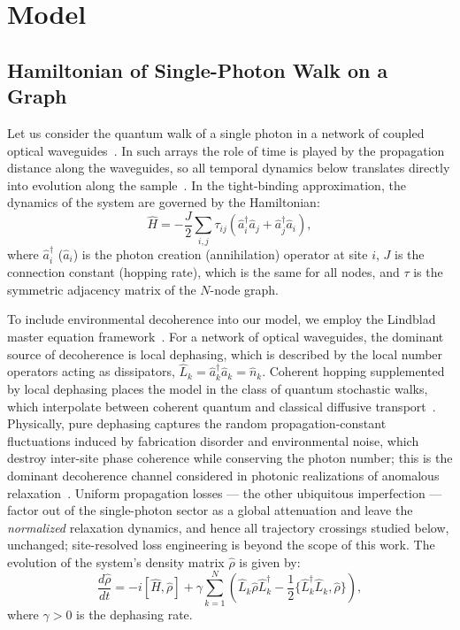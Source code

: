 \documentclass[pdflatex,sn-mathphys-num]{sn-jnl}
\begin{document}
\section{Model}

\subsection{Hamiltonian of Single-Photon Walk on a Graph}
Let us consider the quantum walk of a single photon in a network of coupled optical waveguides~\cite{tang2018}. In such arrays the role of time is played by the propagation distance along the waveguides, so all temporal dynamics below translates directly into evolution along the sample~\cite{tang2018,Longhi2024}. In the tight-binding approximation, the dynamics of the system are governed by the Hamiltonian:
\begin{equation}
\hat{H} = -\frac{J}{2}\sum_{i,j} \tau_{ij}(\hat{a}_i^{\dagger}\hat{a}_j + \hat{a}_j^{\dagger}\hat{a}_i),
\end{equation}
where $\hat{a}_i^\dagger$ ($\hat{a}_i$) is the photon creation (annihilation) operator at site $i$, $J$ is the connection constant (hopping rate), which is the same for all nodes, and $\tau$ is the symmetric adjacency matrix of the $N$-node graph.

To include environmental decoherence into our model, we employ the Lindblad master equation framework~\cite{lindblad1976,gks1976,breuer2002}. For a network of optical waveguides, the dominant source of decoherence is local dephasing, which is described by the local number operators acting as dissipators, $\hat{L}_k = \hat{a}_k^\dagger \hat{a}_k = \hat{n}_k$. Coherent hopping supplemented by local dephasing places the model in the class of quantum stochastic walks, which interpolate between coherent quantum and classical diffusive transport~\cite{Whitfield2010}. Physically, pure dephasing captures the random propagation-constant fluctuations induced by fabrication disorder and environmental noise, which destroy inter-site phase coherence while conserving the photon number; this is the dominant decoherence channel considered in photonic realizations of anomalous relaxation~\cite{Longhi2024}. Uniform propagation losses --- the other ubiquitous imperfection --- factor out of the single-photon sector as a global attenuation and leave the \emph{normalized} relaxation dynamics, and hence all trajectory crossings studied below, unchanged; site-resolved loss engineering is beyond the scope of this work. The evolution of the system's density matrix $\hat{\rho}$ is given by:
\begin{equation}
\frac{d\hat{\rho}}{dt} = -i[\hat{H}, \hat{\rho}] + \gamma \sum_{k=1}^N \left( \hat{L}_k \hat{\rho} \hat{L}_k^\dagger - \frac{1}{2}\{\hat{L}_k^\dagger \hat{L}_k, \hat{\rho}\} \right),
\end{equation}
where $\gamma > 0$ is the dephasing rate. 
\end{document}
